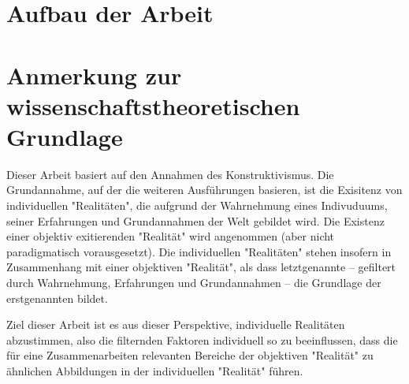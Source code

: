 
\section{Aufbau der Arbeit} %
\label{sec:aufbau_der_arbeit}


\section{Anmerkung zur wissenschaftstheoretischen Grundlage}

Dieser Arbeit basiert auf den Annahmen des Konstruktivismus. Die Grundannahme, auf der die weiteren Ausführungen basieren, ist die Exisitenz von individuellen "Realitäten", die aufgrund der Wahrnehmung eines Indivuduums, seiner Erfahrungen und Grundannahmen der Welt gebildet wird. Die Existenz einer objektiv exitierenden "Realität" wird angenommen (aber nicht paradigmatisch vorausgesetzt). Die individuellen "Realitäten" stehen insofern in Zusammenhang mit einer objektiven "Realität", als dass letztgenannte -- gefiltert durch Wahrnehmung, Erfahrungen und Grundannahmen -- die Grundlage der erstgenannten bildet.

Ziel dieser Arbeit ist es aus dieser Perspektive, individuelle Realitäten abzustimmen, also die filternden Faktoren individuell so zu beeinflussen, dass die für eine Zusammenarbeiten relevanten Bereiche der objektiven "Realität" zu ähnlichen Abbildungen in der individuellen "Realität" führen.

